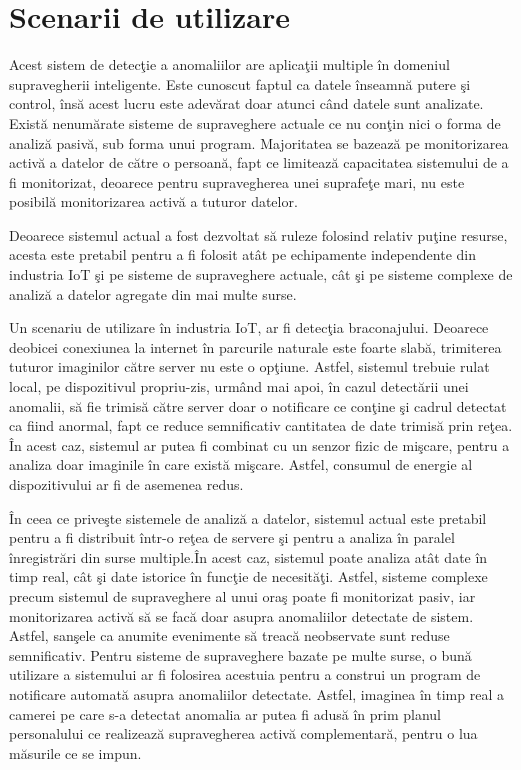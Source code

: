 \documentclass[a4paper,12pt]{report}
\begin{document}
\section{Scenarii de utilizare}
\quad Acest sistem de detecţie a anomaliilor are aplicaţii multiple în domeniul supravegherii inteligente. Este cunoscut faptul ca datele înseamnă putere şi control, însă acest lucru este adevărat doar atunci când datele sunt analizate. Există nenumărate sisteme de supraveghere actuale ce nu conţin nici o forma de analiză pasivă, sub forma unui program. Majoritatea se bazează pe monitorizarea activă a datelor de către o persoană, fapt ce limitează capacitatea sistemului de a fi monitorizat, deoarece pentru supravegherea unei suprafeţe mari, nu este posibilă monitorizarea activă a tuturor datelor. 
\par Deoarece sistemul actual a fost dezvoltat să ruleze folosind relativ puţine resurse, acesta este pretabil pentru a fi folosit atât pe echipamente independente din industria IoT şi pe sisteme de supraveghere actuale, cât şi pe sisteme complexe de analiză a datelor agregate din mai multe surse.
\par Un scenariu de utilizare în industria IoT, ar fi detecţia braconajului. Deoarece deobicei conexiunea la internet în parcurile naturale este foarte slabă, trimiterea tuturor imaginilor către server nu este o opţiune. Astfel, sistemul trebuie rulat local, pe dispozitivul propriu-zis, urmând mai apoi, în cazul detectării unei anomalii, să fie trimisă către server doar o notificare ce conţine şi cadrul detectat ca fiind anormal, fapt ce reduce semnificativ cantitatea de date trimisă prin reţea. În acest caz, sistemul ar putea fi combinat cu un senzor fizic de mişcare, pentru a analiza doar imaginile în care există mişcare. Astfel, consumul de energie al dispozitivului ar fi de asemenea redus. 
\par În ceea ce priveşte sistemele de analiză a datelor, sistemul actual este pretabil pentru a fi distribuit într-o reţea de servere şi pentru a analiza în paralel înregistrări din surse multiple.În acest caz, sistemul poate analiza atât date în timp real, cât şi date istorice în funcţie de necesităţi. Astfel, sisteme complexe precum sistemul de supraveghere al unui oraş poate fi monitorizat pasiv, iar monitorizarea activă să se facă doar asupra anomaliilor detectate de sistem. Astfel, sanşele ca anumite evenimente să treacă neobservate sunt reduse semnificativ. Pentru sisteme de supraveghere bazate pe multe surse, o bună utilizare a sistemului ar fi folosirea acestuia pentru a construi un program de notificare automată asupra anomaliilor detectate. Astfel, imaginea în timp real a camerei pe care s-a detectat anomalia ar putea fi adusă în prim planul personalului ce realizează supravegherea activă complementară, pentru o lua măsurile ce se impun.
\end{document}
